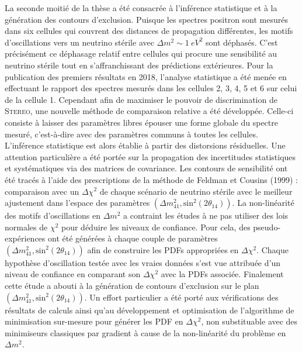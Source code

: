 La seconde moitié de la thèse a été consacrée à l'inférence statistique et à la génération des contours d'exclusion. Puisque les spectres positron sont mesurés dans six cellules qui couvrent des distances de propagation différentes, les motifs d'oscillations vers un neutrino stérile avec $\Delta m^2 \sim \SI{1}{eV^2}$ sont déphasés. C'est précisément ce déphasage relatif entre cellules qui procure une sensibilité au neutrino stérile tout en s'affranchissant des prédictions extérieures. Pour la publication des premiers résultats en 2018, l'analyse statistique a été menée en effectuant le rapport des spectres mesurés dans les cellules 2, 3, 4, 5 et 6 sur celui de la cellule 1. Cependant afin de maximiser le pouvoir de discrimination de \textsc{Stereo}, une nouvelle méthode de comparaison relative a été développée. Celle-ci consiste à laisser des paramètres libres épouser une forme globale du spectre mesuré, c'est-à-dire avec des paramètres communs à toutes les cellules. L'inférence statistique est alors établie à partir des distorsions résiduelles. Une attention particulière a été portée sur la propagation des incertitudes statistiques et systématiques via des matrices de covariance. Les contours de sensibilité ont été tracés à l'aide des prescriptions de la méthode de Feldman et Cousins (1999) : comparaison avec un $\Delta \chi^2$ de chaque scénario de neutrino stérile avec le meilleur ajustement dans l'espace des paramètres $(\Delta m^2_{41}, \textrm{sin}^2(2\theta_{14}))$. La non-linéarité des motifs d'oscillations en $\Delta m^2$ a contraint les études à ne pas utiliser des lois normales de $\chi^2$ pour déduire les niveaux de confiance. Pour cela, des pseudo-expériences ont été générées à chaque couple de paramètres $(\Delta m^2_{41}, \textrm{sin}^2(2\theta_{14}))$ afin de construire les PDFs appropriées en $\Delta \chi^2$. Chaque hypothèse d'oscillation testée avec les vraies données s'est vue attribuée d'un niveau de confiance en comparant son $\Delta \chi^2$ avec la PDFs associée. Finalement cette étude a abouti à la génération de contours d'exclusion sur le plan $(\Delta m^2_{41}, \textrm{sin}^2(2\theta_{14}))$. Un effort particulier a été porté aux vérifications des résultats de calculs ainsi qu'au développement et optimisation de l'algorithme de minimisation sur-mesure pour générer les PDF en $\Delta \chi^2$, non substituable avec des minimiseurs classiques par gradient à cause de la non-linéarité du problème en $\Delta m^2$.\\

